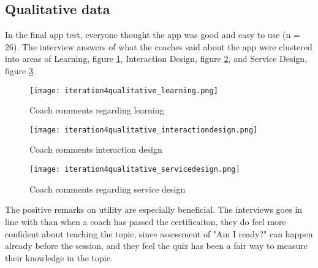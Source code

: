 \subsection{Qualitative data}

In the final app test, everyone thought the app was good and easy to use (n = 26). The interview answers of what the coaches said about the app were clustered into areas of Learning, figure \ref{fig:learning}, Interaction Design, figure \ref{fig:interactiondesign}, and Service Design, figure \ref{fig:servicedesign}.

\begin{figure}[h]
    \centering
    \texttt{[image: iteration4qualitative\_learning.png]}
    \caption{Coach comments regarding learning}
    \label{fig:learning}
\end{figure}

\begin{figure}[h]
    \centering
    \texttt{[image: iteration4qualitative\_interactiondesign.png]}
    \caption{Coach comments interaction design}
    \label{fig:interactiondesign}
\end{figure}

\begin{figure}[h]
    \centering
    \texttt{[image: iteration4qualitative\_servicedesign.png]}
    \caption{Coach comments regarding service design}
    \label{fig:servicedesign}
\end{figure}

The positive remarks on utility are especially beneficial. The interviews goes in line with than when a coach has passed the certificaiton, they do feel more confident about teaching the topic, since assessment of "Am I ready?" can happen already before the session, and they feel the quiz has been a fair way to measure their knowledge in the topic.

